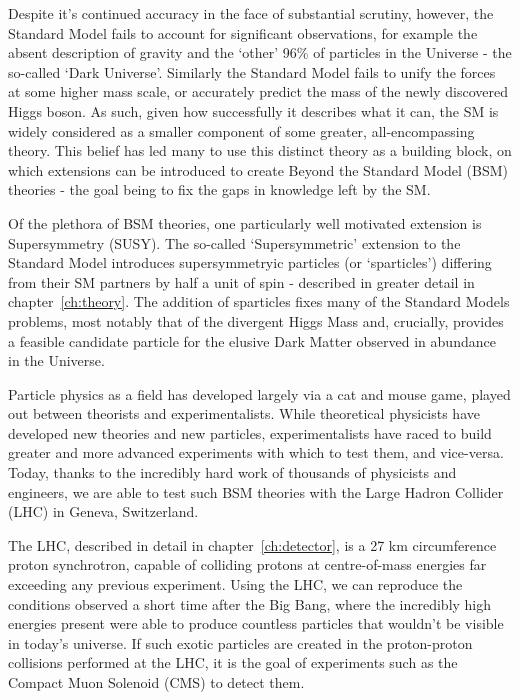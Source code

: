 Despite it's continued accuracy in the face of substantial scrutiny, however,
the Standard Model fails to account for significant observations, for example
the absent description of gravity and the `other' 96\% of particles in the
Universe - the so-called `Dark Universe'. Similarly the Standard Model fails to
unify the forces at some higher mass scale, or accurately predict the mass of
the newly
discovered Higgs boson. As such, given how successfully it describes what it
can, the SM is widely considered
as a smaller component of some greater, all-encompassing theory.
This belief has led many to use this distinct theory as a building
block, on which extensions can be introduced to create Beyond the Standard Model
(BSM) theories - the goal being to fix the gaps in knowledge left by the SM.

Of the plethora of BSM theories, one particularly well motivated extension is
Supersymmetry (SUSY). The so-called `Supersymmetric' extension to the Standard
Model introduces supersymmetryic particles (or `sparticles') differing from
their SM partners by half a unit of spin - described in greater detail in
chapter~\ref{ch:theory}. The addition of sparticles fixes
many of the Standard Models problems, most notably that of the
divergent Higgs Mass and, crucially, provides a feasible
candidate particle for the elusive Dark Matter observed in abundance in the
Universe.

Particle physics as a field has developed largely via a cat and mouse game,
played out between theorists and experimentalists. While theoretical physicists
have
developed new theories and new particles, experimentalists have raced to build
greater and more advanced experiments with which to test them, and vice-versa.
Today, thanks to the incredibly hard work of thousands of physicists and
engineers, we are able to test such BSM theories with the Large
Hadron Collider (LHC) in Geneva, Switzerland.

The LHC, described in detail in chapter~\ref{ch:detector}, is a 27 km
circumference proton synchrotron, capable of colliding protons
at centre-of-mass energies far exceeding any previous experiment.
Using the LHC, we can reproduce the conditions observed a short time
after the Big Bang, where the incredibly high energies present were able to
produce countless particles that wouldn't be visible in today's universe. If
such exotic particles are created in the proton-proton collisions performed at
the LHC, it is the goal of experiments such as the Compact Muon Solenoid (CMS)
to detect them.

